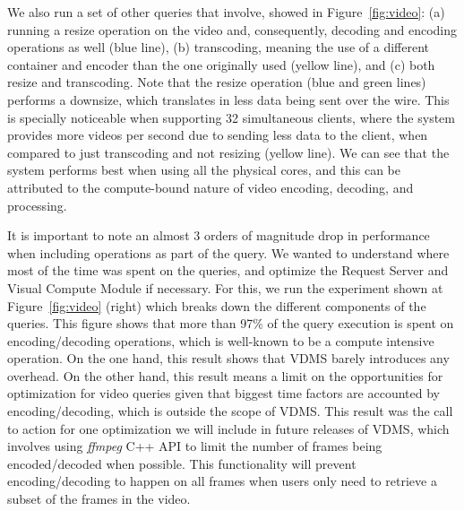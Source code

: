 We also run a set of other queries that involve, showed in Figure~\ref{fig:video}:
(a) running a resize operation on the video and, consequently,
decoding and encoding operations as well (blue line),
(b) transcoding, meaning the use of a different container and encoder
than the one originally used (yellow line), and
(c) both resize and transcoding.
Note that the resize operation (blue and green lines) performs a downsize,
which translates in less data being sent over the wire.
This is specially noticeable when supporting 32 simultaneous clients,
where the system provides more videos per second due to sending less data to
the client, when compared to just transcoding and not resizing (yellow line).
We can see that the system performs best when using all the physical cores,
and this can be attributed to the compute-bound nature of video
encoding, decoding, and processing.

It is important to note an almost 3 orders of magnitude drop in performance
when including operations as part of the query.
We wanted to understand where most of the time was spent on the queries,
and optimize the Request Server and Visual Compute Module
if necessary. For this, we run the experiment shown at
Figure~\ref{fig:video} (right) which breaks down the different components of the
queries. This figure shows that more than 97\% of the query execution is spent
on encoding/decoding operations, which is well-known to be a
compute intensive operation\cite{videosgoogle}.
On the one hand, this result shows that VDMS barely introduces any overhead.
On the other hand, this result means a limit on the opportunities
for optimization for video queries given that biggest time factors
are accounted by encoding/decoding, which is outside the scope of VDMS.
This result was the call to action for one optimization we will include
in future releases of VDMS, which involves using \textit{ffmpeg} C++ API to
limit the number of frames being encoded/decoded when possible.
This functionality will prevent encoding/decoding to happen on all frames
when users only need to retrieve a subset of the frames in the video.

